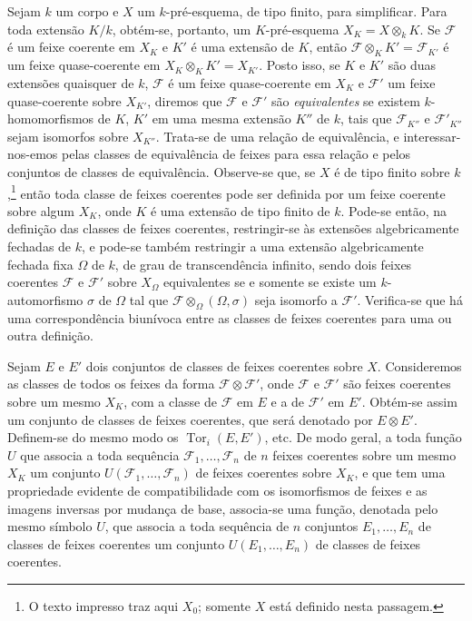 Sejam $k$ um corpo e $X$ um $k$-pré-esquema, de tipo finito, para simplificar.
Para toda extensão $K/k$, obtém-se, portanto, um $K$-pré-esquema
$X_K=X\otimes_k K$. Se $\mathcal F$ é um feixe coerente em $X_K$ e $K'$ é
uma extensão de $K$, então $\mathcal F\otimes_K K'=\mathcal F_{K'}$ é um
feixe quase-coerente em $X_K\otimes_K K'=X_{K'}$. Posto isso, se $K$ e $K'$
são duas extensões quaisquer de $k$, $\mathcal F$ é um feixe quase-coerente em
$X_K$ e $\mathcal F'$
um feixe quase-coerente sobre $X_{K'}$, diremos que $\mathcal F$ e
$\mathcal F'$ são \emph{equivalentes} se existem $k$-homomorfismos de $K$,
$K'$ em uma mesma extensão $K''$ de $k$, tais que $\mathcal F_{K''}$ e
$\mathcal F'_{K''}$ sejam isomorfos sobre $X_{K''}$. Trata-se de uma relação de
equivalência, e interessar-nos-emos pelas classes de equivalência de feixes
para essa relação e pelos conjuntos de classes de equivalência. Observe-se que,
se $X$ é de tipo finito sobre $k$,\footnote{O texto impresso traz aqui $X_0$;
somente $X$ está definido nesta passagem.} então toda classe de feixes
coerentes pode ser definida por um feixe coerente sobre algum $X_K$, onde $K$
é uma extensão de tipo finito de $k$. Pode-se então, na definição das classes
de feixes coerentes, restringir-se às extensões algebricamente fechadas de $k$,
e pode-se também restringir a uma extensão algebricamente fechada fixa $\Omega$
de $k$, de grau de transcendência infinito, sendo dois feixes coerentes
$\mathcal F$ e $\mathcal F'$ sobre $X_\Omega$ equivalentes se e somente se
existe um $k$-automorfismo $\sigma$ de $\Omega$ tal que
$\mathcal F\otimes_\Omega(\Omega,\sigma)$ seja isomorfo a $\mathcal F'$.
Verifica-se que há uma correspondência biunívoca entre as classes de feixes
coerentes para uma ou outra definição.

Sejam $E$ e $E'$ dois conjuntos de classes de feixes coerentes sobre $X$.
Consideremos as classes de todos os feixes da forma
$\mathcal F\otimes\mathcal F'$, onde $\mathcal F$ e $\mathcal F'$ são feixes
coerentes sobre um mesmo $X_K$, com a classe de $\mathcal F$ em $E$ e a de
$\mathcal F'$ em $E'$. Obtém-se assim um conjunto de classes de feixes
coerentes, que será denotado por $E\otimes E'$. Definem-se do mesmo modo os
$\operatorname{Tor}_i(E,E')$, etc. De modo geral, a toda função $U$ que associa
a toda sequência $\mathcal F_1,\ldots,\mathcal F_n$ de $n$ feixes coerentes
sobre um mesmo $X_K$ um conjunto $U(\mathcal F_1,\ldots,\mathcal F_n)$ de
feixes coerentes sobre $X_K$, e que tem uma propriedade evidente de
compatibilidade com os isomorfismos de feixes e as imagens inversas por mudança
de base, associa-se uma função, denotada pelo mesmo símbolo $U$, que associa a
toda sequência de $n$ conjuntos $E_1,\ldots,E_n$ de classes de feixes
coerentes um conjunto $U(E_1,\ldots,E_n)$ de classes de feixes coerentes.

